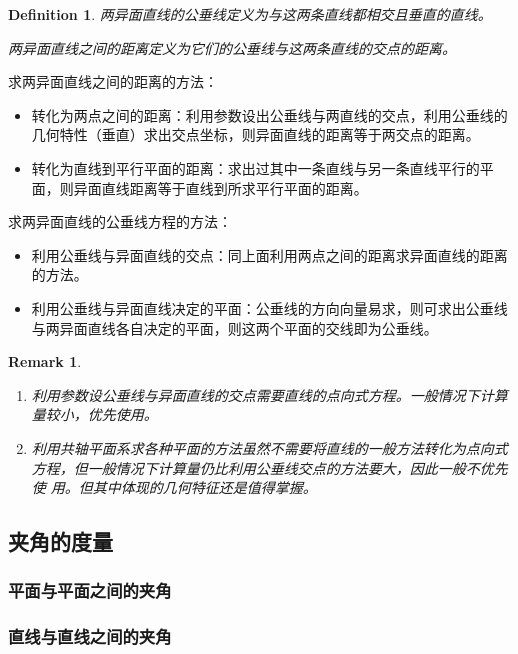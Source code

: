 \documentclass[onecolumn]{ctexart}
\newtheorem{definition}{Definition}
\newtheorem{remark}{Remark}
\begin{document}
\begin{definition}
  两异面直线的公垂线定义为与这两条直线都相交且垂直的直线。

  两异面直线之间的距离定义为它们的公垂线与这两条直线的交点的距离。
\end{definition}

求两异面直线之间的距离的方法：
\begin{itemize}
  \item 转化为两点之间的距离：利用参数设出公垂线与两直线的交点，利用公垂线的几何特性（垂直）求出交点坐标，则异面直线的距离等于两交点的距离。
  \item 转化为直线到平行平面的距离：求出过其中一条直线与另一条直线平行的平面，则异面直线距离等于直线到所求平行平面的距离。
\end{itemize}

求两异面直线的公垂线方程的方法：
\begin{itemize}
  \item 利用公垂线与异面直线的交点：同上面利用两点之间的距离求异面直线的距离的方法。
  \item 利用公垂线与异面直线决定的平面：公垂线的方向向量易求，则可求出公垂线与两异面直线各自决定的平面，则这两个平面的交线即为公垂线。
\end{itemize}

\begin{remark}
  \begin{enumerate}
    \item 利用参数设公垂线与异面直线的交点需要直线的点向式方程。一般情况下计算量较小，优先使用。
    \item 利用共轴平面系求各种平面的方法虽然不需要将直线的一般方法转化为点向式方程，但一般情况下计算量仍比利用公垂线交点的方法要大，因此一般不优先使
    用。但其中体现的几何特征还是值得掌握。
  \end{enumerate}
\end{remark}

\subsection{夹角的度量}

\subsubsection{平面与平面之间的夹角}

\subsubsection{直线与直线之间的夹角}
\end{document}
